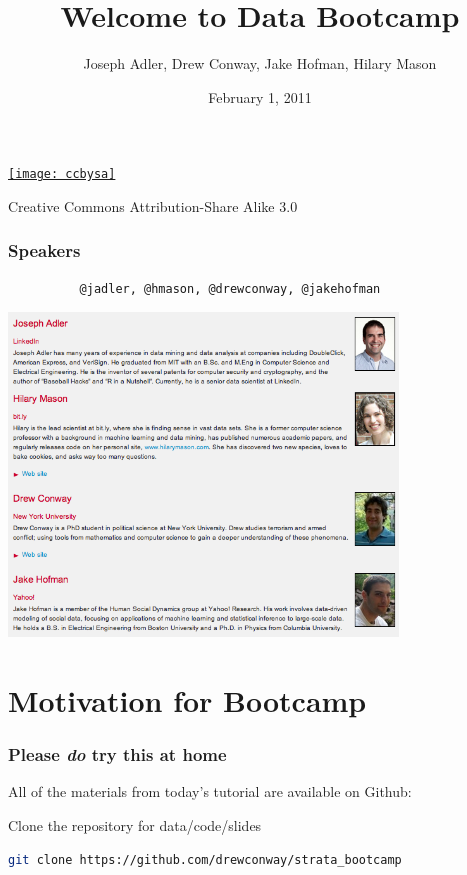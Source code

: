 \documentclass[xcolor=dvipsnames, 9pt]{beamer}
\title{Welcome to Data Bootcamp}
\author{Joseph Adler, Drew Conway, Jake Hofman, Hilary Mason}
\date{February 1, 2011}
\begin{document}
 
    
\begin{frame}[plain]
  \titlepage 

  \tiny
  \href{http://creativecommons.org/licenses/by-sa/3.0/us/}{\texttt{[image: ccbysa]}}

  Creative Commons Attribution-Share Alike 3.0
\end{frame}


\begin{frame}[fragile]
    \frametitle{Speakers}
\begin{verbatim}
          @jadler, @hmason, @drewconway, @jakehofman
\end{verbatim}
    \vskip5pt
    \begin{center}
        \includegraphics[width=0.775\textwidth]{speakers.png} \\
    \end{center}
\end{frame}


\section{Motivation for Bootcamp} %
\label{sec:motivation_for_bootcamp}

\begin{frame}[fragile]
    \frametitle{Please \textit{do} try this at home}
    All of the materials from today's tutorial are available on Github:
    \vskip20pt
    \begin{block}{Clone the repository for data/code/slides}
        \begin{lstlisting}[language=bash]
git clone https://github.com/drewconway/strata_bootcamp
        \end{lstlisting}
    \end{block}
\end{frame}
\end{document}
